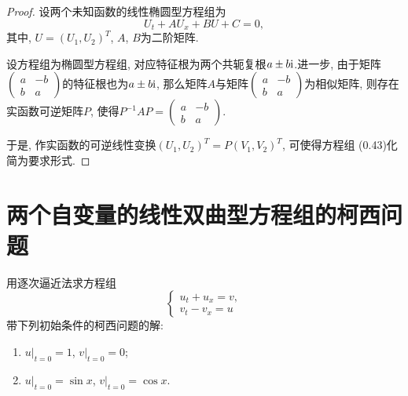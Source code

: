 \begin{proof}
	设两个未知函数的线性椭圆型方程组为
	$$U_t+AU_x+BU+C=0,$$
	其中, $U=( U_1, U_2)^T$, $A$, $B$为二阶矩阵.
	
	设方程组为椭圆型方程组, 对应特征根为两个共轭复根$a\pm b\mathrm{i}$.进一步,  由于矩阵$\begin{pmatrix}a&-b\\b&a\end{pmatrix}$的特征根也为$a\pm b\mathrm{i}$, 那么矩阵$A$与矩阵$\begin{pmatrix}a&-b\\b&a\end{pmatrix}$为相似矩阵, 则存在实函数可逆矩阵$P$, 使得$P^{-1}AP=\begin{pmatrix}a&-b\\b&a\end{pmatrix}$.
	
	于是, 作实函数的可逆线性变换$(U_1,U_2)^T=P(V_1,V_2)^T$, 可使得方程组
	(0.43)化简为要求形式.
\end{proof}


\section{两个自变量的线性双曲型方程组的柯西问题}

\begin{exercise}
  用逐次逼近法求方程组
  \[\begin{cases}
    u_t + u_x = v, \\
    v_t - v_x = u
  \end{cases}\]
  带下列初始条件的柯西问题的解:
  \begin{enumerate}[(1)]
    \item $u|_{t=0}=1$, $v|_{t=0}=0$;
    \item $u|_{t=0}=\sin x$, $v|_{t=0}=\cos x$.
  \end{enumerate}
\end{exercise}

